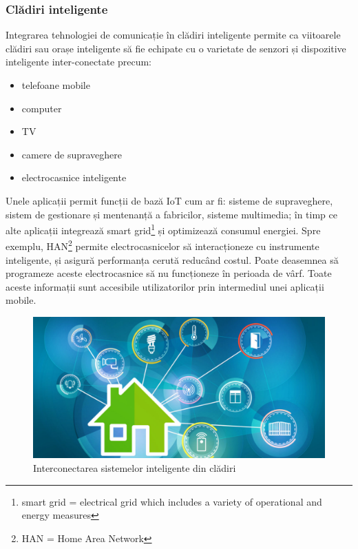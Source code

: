 \documentclass[12pt,a4paper]{report}
\begin{document}
\subsubsection{Clădiri inteligente}
Integrarea tehnologiei de comunicație în clădiri inteligente permite ca viitoarele clădiri sau orașe inteligente să fie echipate cu o varietate de senzori și dispozitive inteligente inter-conectate precum:
\begin{itemize}
	\item{telefoane mobile}
	\item{computer}
	\item{TV}
	\item{camere de supraveghere}
	\item{electrocasnice inteligente}
\end{itemize}
Unele aplicații permit funcții de bază IoT cum ar fi: sisteme de supraveghere, sistem de gestionare și mentenanță a fabricilor, sisteme multimedia; în timp ce alte aplicații integrează smart grid\footnote{smart grid = electrical grid which includes a variety of operational and energy measures} și optimizează consumul energiei. Spre exemplu, HAN\footnote{HAN = Home Area Network} permite electrocasnicelor să interacționeze cu instrumente inteligente, și asigură performanța cerută reducând costul. Poate deasemnea să programeze aceste electrocasnice să nu funcționeze în perioada de vârf. Toate aceste informații sunt accesibile utilizatorilor prin intermediul unei aplicații mobile.
\begin{figure}[th]
\centering
\includegraphics{pics/iot_home.jpg}
  \caption{Interconectarea sistemelor inteligente din clădiri}
  \label{fig:iot_home}
\end{figure}
\end{document}
